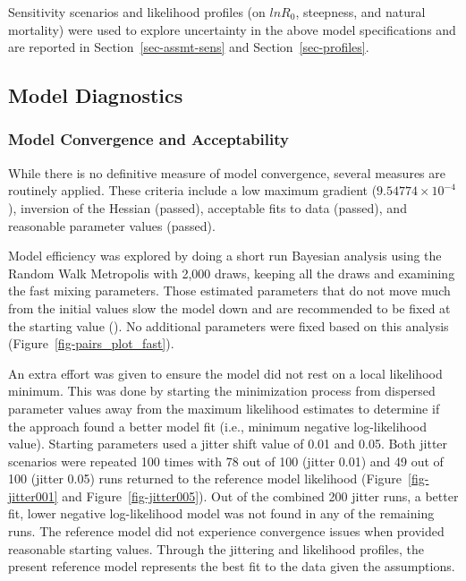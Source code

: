 \documentclass[
]{scrartcl}
\begin{document}
Sensitivity scenarios and likelihood profiles (on \(lnR_0\), steepness,
and natural mortality) were used to explore uncertainty in the above
model specifications and are reported in Section~\ref{sec-assmt-sens}
and Section~\ref{sec-profiles}.

\newpage{}

\subsection{Model Diagnostics}\label{model-diagnostics}

\subsubsection{Model Convergence and
Acceptability}\label{sec-model-convergence}

While there is no definitive measure of model convergence, several
measures are routinely applied. These criteria include a low maximum
gradient (\ensuremath{9.54774\times 10^{-4}}), inversion of the Hessian
(passed), acceptable fits to data (passed), and reasonable parameter
values (passed).

Model efficiency was explored by doing a short run Bayesian analysis
using the Random Walk Metropolis with 2,000 draws, keeping all the draws
and examining the fast mixing parameters. Those estimated parameters
that do not move much from the initial values slow the model down and
are recommended to be fixed at the starting value
(). No
additional parameters were fixed based on this analysis
(Figure~\ref{fig-pairs_plot_fast}).

An extra effort was given to ensure the model did not rest on a local
likelihood minimum. This was done by starting the minimization process
from dispersed parameter values away from the maximum likelihood
estimates to determine if the approach found a better model fit (i.e.,
minimum negative log-likelihood value). Starting parameters used a
jitter shift value of 0.01 and 0.05. Both jitter scenarios were repeated
100 times with 78 out of 100 (jitter 0.01) and 49 out of 100 (jitter
0.05) runs returned to the reference model likelihood
(Figure~\ref{fig-jitter001} and Figure~\ref{fig-jitter005}). Out of the
combined 200 jitter runs, a better fit, lower negative log-likelihood
model was not found in any of the remaining runs. The reference model
did not experience convergence issues when provided reasonable starting
values. Through the jittering and likelihood profiles, the present
reference model represents the best fit to the data given the
assumptions.
\end{document}
